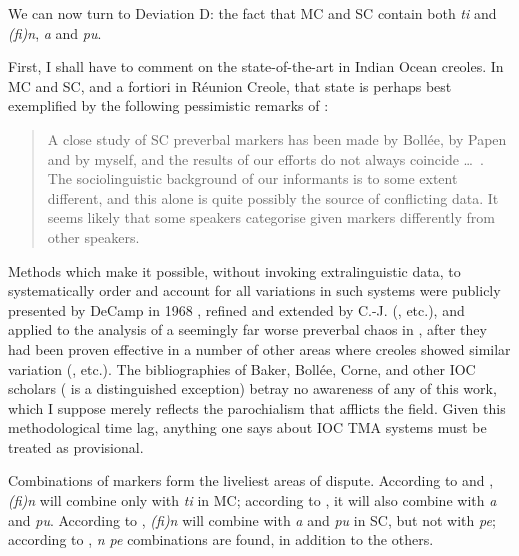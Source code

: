 We can now turn to Deviation D: the fact that MC and SC contain both \textit{ti} and \textit{(fi)n}, \textit{a} and \textit{pu}.

First, I shall have to comment on the state-of-the-art in Indian Ocean creoles. In MC and SC, and a fortiori in Réunion Creole, that state is perhaps best exemplified by the following pessimistic remarks of \citet[94--95]{Corne1977}:

\begin{quote}
A close study of SC preverbal markers has been made by Bollée, by Papen and by myself, and the results of our efforts do not always coincide \ldots~. The sociolinguistic background of our informants is to some extent different, and this alone is quite possibly the source of conflicting data. It seems likely that some speakers categorise given markers differently from other speakers.
\end{quote}

Methods which make it possible, without invoking extralinguistic data, to systematically order and account for all variations in such systems were publicly presented by DeCamp in 1968 \citep{DeCamp1971}, refined and extended by C.-J. \citeauthor{Bailey1973} (\citeyear{Bailey1973}, etc.), and applied to the analysis of a seemingly far worse preverbal chaos in \citet{Bickerton1975}, after they had been proven effective in a number of other areas where creoles showed similar variation (\citealt{Bickerton1971,Bickerton1973a,Bickerton1973b}, etc.). The bibliographies of Baker, Bollée, Corne, and other IOC scholars (\citealt{CarayolEtAl1977} is a distinguished exception) betray no awareness of any of this work, which I suppose merely reflects the parochialism that afflicts the field. Given this methodological time lag, anything one says about IOC TMA systems must be treated as provisional.

Combinations of markers form the liveliest areas of dispute. According to \citet{Baker1972} and \citet{Valdman1980}, \textit{(fi)n} will combine only with \textit{ti} in MC; according to \citet{Moorghen1975}, it will also combine with \textit{a} and \textit{pu}. According to \citet{Bollee1977}, \textit{(fi)n} will combine with \textit{a} and \textit{pu} in SC, but not with \textit{pe}; according to \citet{Corne1977}, \textit{n pe} com\-binations are found, in addition to the others.

